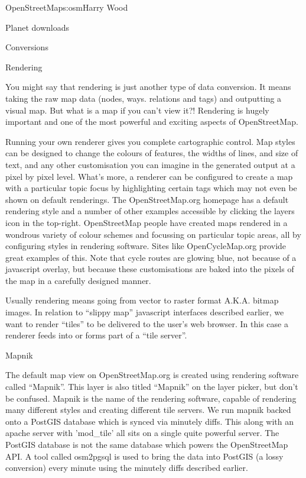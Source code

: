 \begin{aosachapter}{OpenStreetMap}{s:osm}{Harry Wood}
\begin{aosasect1}{Planet downloads}
\begin{aosasect2}{Conversions}
\end{aosasect2}

\end{aosasect1}

\begin{aosasect1}{Rendering}

You might say that rendering is just another type of data
conversion. It means taking the raw map data (nodes, ways. relations
and tags) and outputting a visual map. But what is a map if you can't
view it?! Rendering is hugely important and one of the most powerful
and exciting aspects of OpenStreetMap.

Running your own renderer gives you complete cartographic control. Map
styles can be designed to change the colours of features, the widths
of lines, and size of text, and any other customisation you can
imagine in the generated output at a pixel by pixel level. What's
more, a renderer can be configured to create a map with a particular
topic focus by highlighting certain tags which may not even be shown
on default renderings. The OpenStreetMap.org homepage has a default
rendering style and a number of other examples accessible by clicking
the layers icon in the top-right. OpenStreetMap people have created
maps rendered in a wondrous variety of colour schemes and focussing on
particular topic areas, all by configuring styles in rendering
software. Sites like OpenCycleMap.org provide great examples of
this. Note that cycle routes are glowing blue, not because of a
javascript overlay, but because these customisations are baked into
the pixels of the map in a carefully designed manner.

Usually rendering means going from vector to raster format
A.K.A. bitmap images. In relation to ``slippy map'' javascript
interfaces described earlier, we want to render ``tiles'' to be
delivered to the user's web browser. In this case a renderer feeds
into or forms part of a ``tile server''.

\begin{aosasect2}{Mapnik}

The default map view on OpenStreetMap.org is created using rendering
software called ``Mapnik''. This layer is also titled ``Mapnik'' on
the layer picker, but don't be confused. Mapnik is the name of the
rendering software, capable of rendering many different styles and
creating different tile servers. We run mapnik backed onto a PostGIS
database which is synced via minutely diffs. This along with an apache
server with 'mod\_tile' all sits on a single quite powerful server. The
PostGIS database is not the same database which powers the
OpenStreetMap API. A tool called osm2pgsql is used to bring the data
into PostGIS (a lossy conversion) every minute using the minutely
diffs described earlier.


\end{aosasect2}
\end{aosasect1}
\end{aosachapter}
